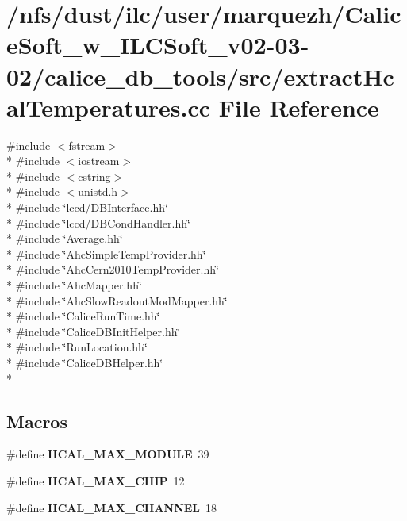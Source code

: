 \section{/nfs/dust/ilc/user/marquezh/\-Calice\-Soft\-\_\-w\-\_\-\-I\-L\-C\-Soft\-\_\-v02-\/03-\/02/calice\-\_\-db\-\_\-tools/src/extract\-Hcal\-Temperatures.cc File Reference}
\label{extractHcalTemperatures_8cc}
{\ttfamily \#include $<$fstream$>$}\\*
{\ttfamily \#include $<$iostream$>$}\\*
{\ttfamily \#include $<$cstring$>$}\\*
{\ttfamily \#include $<$unistd.\-h$>$}\\*
{\ttfamily \#include \char`\"{}lccd/\-D\-B\-Interface.\-hh\char`\"{}}\\*
{\ttfamily \#include \char`\"{}lccd/\-D\-B\-Cond\-Handler.\-hh\char`\"{}}\\*
{\ttfamily \#include \char`\"{}Average.\-hh\char`\"{}}\\*
{\ttfamily \#include \char`\"{}Ahc\-Simple\-Temp\-Provider.\-hh\char`\"{}}\\*
{\ttfamily \#include \char`\"{}Ahc\-Cern2010\-Temp\-Provider.\-hh\char`\"{}}\\*
{\ttfamily \#include \char`\"{}Ahc\-Mapper.\-hh\char`\"{}}\\*
{\ttfamily \#include \char`\"{}Ahc\-Slow\-Readout\-Mod\-Mapper.\-hh\char`\"{}}\\*
{\ttfamily \#include \char`\"{}Calice\-Run\-Time.\-hh\char`\"{}}\\*
{\ttfamily \#include \char`\"{}Calice\-D\-B\-Init\-Helper.\-hh\char`\"{}}\\*
{\ttfamily \#include \char`\"{}Run\-Location.\-hh\char`\"{}}\\*
{\ttfamily \#include \char`\"{}Calice\-D\-B\-Helper.\-hh\char`\"{}}\\*
\subsection*{Macros}
\begin{DoxyCompactItemize}
\item 
\#define {\bfseries H\-C\-A\-L\-\_\-\-M\-A\-X\-\_\-\-M\-O\-D\-U\-L\-E}~39\label{extractHcalTemperatures_8cc_a76fff6cee3e56a904e5fb36c538cfda3}

\item 
\#define {\bfseries H\-C\-A\-L\-\_\-\-M\-A\-X\-\_\-\-C\-H\-I\-P}~12\label{extractHcalTemperatures_8cc_ae9aff8fe25711ec20f0caf6db90ae060}

\item 
\#define {\bfseries H\-C\-A\-L\-\_\-\-M\-A\-X\-\_\-\-C\-H\-A\-N\-N\-E\-L}~18\label{extractHcalTemperatures_8cc_a5ce1ff92baa7e4a39bd2e8f920e1d95c}

\end{DoxyCompactItemize}

